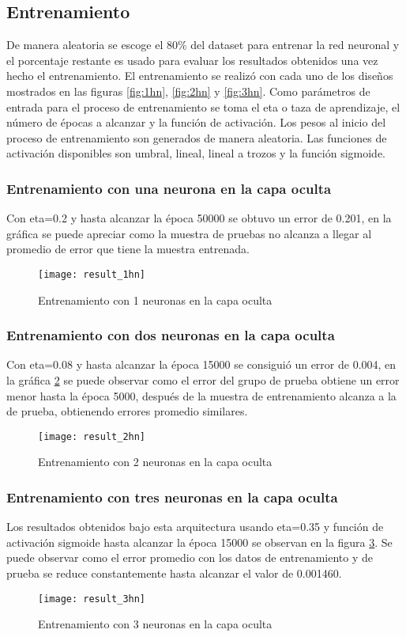 \documentclass[11pt]{article}
\begin{document}
\subsection{Entrenamiento}
De manera aleatoria se escoge  el 80\% del dataset para entrenar la red neuronal y el porcentaje
restante es usado para evaluar los resultados obtenidos una vez hecho el entrenamiento.
El entrenamiento se realiz\'o con cada uno de los dise\~nos mostrados en las figuras \ref{fig:1hn}, \ref{fig:2hn} y \ref{fig:3hn}.
Como par\'ametros de entrada para el proceso de entrenamiento se toma el eta o taza de aprendizaje, el n\'umero de \'epocas a alcanzar y la funci\'on de activaci\'on.
Los pesos al inicio del proceso de entrenamiento son generados de manera aleatoria. Las funciones de activaci\'on disponibles son umbral, lineal, lineal a trozos y la funci\'on sigmoide.
\subsubsection{Entrenamiento con una neurona en la capa oculta}
Con eta=0.2 y hasta alcanzar la \'epoca 50000 se obtuvo un error de 0.201, en la gráfica se puede apreciar como la muestra de pruebas no alcanza a llegar al promedio de error que tiene la muestra entrenada.
\begin{figure}[H]
    \texttt{[image: result\_1hn]}
    \centering
    \caption{Entrenamiento con 1 neuronas en la capa oculta}
    \label{fig:result_1hn}
\end{figure}
\subsubsection{Entrenamiento con dos neuronas en la capa oculta}
Con eta=0.08 y hasta alcanzar la \'epoca 15000 se consigui\'o un error de 0.004, en la gráfica \ref{fig:result_2hn} se puede observar como el error del grupo de prueba obtiene un error menor hasta la \'epoca 5000, despu\'es de la muestra de entrenamiento alcanza a la de prueba, obtienendo errores promedio similares.
\begin{figure}[H]
    \texttt{[image: result\_2hn]}
    \centering
    \caption{Entrenamiento con 2 neuronas en la capa oculta}
    \label{fig:result_2hn}
\end{figure}
\subsubsection{Entrenamiento con tres neuronas en la capa oculta}
Los resultados obtenidos bajo esta arquitectura usando eta=0.35 y funci\'on de activaci\'on sigmoide
hasta alcanzar la \'epoca 15000 se observan en la figura \ref{fig:result_3hn}. Se puede observar como el error promedio con los datos de entrenamiento y de prueba
se reduce constantemente hasta alcanzar el valor de 0.001460.
\begin{figure}[H]
    \texttt{[image: result\_3hn]}
    \centering
    \caption{Entrenamiento con 3 neuronas en la capa oculta}
    \label{fig:result_3hn}
\end{figure}
\end{document}
